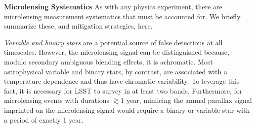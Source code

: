 

\noindent \textbf{Microlensing Systematics}
As with any physics experiment, there are microlensing measurement systematics that must be accounted for.
We briefly summarize these, and mitigation strategies, here.

\emph{Variable and binary stars} are a potential source of false detections at all timescales. However, the microlensing signal can be distinguished because, modulo secondary ambiguous blending effects, it is achromatic. Most astrophysical variable and binary stars, by contrast, are associated with a temperature dependence and thus have chromatic variability. To leverage this fact, it is necessary for LSST to survey in at least two bands. Furthermore, for microlensing events with durations $\gtrsim 1$ year, mimicing the annual parallax signal imprinted on the microlensing signal would require a binary or variable star with a period of exactly $1$ year.


